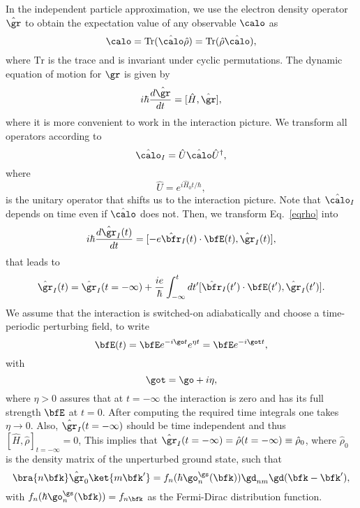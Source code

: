 \documentclass[floatfix,prb,aps,superscriptaddress,11pt,preprint,letterpaper]{revtex4}
\begin{document}
In the independent particle approximation, we use the electron density
operator $\hat\gr$ to obtain the expectation value of any observable
$\calo$ as
\begin{equation}\label{traza}
\calo=\mathrm{Tr}(\hat\calo\hat\rho)=\mathrm{Tr}(\hat\rho\hat\calo),
\end{equation}
where $\mathrm{Tr}$ is the trace and is invariant under cyclic permutations.
The dynamic equation of motion for $\gr$ is given by
\begin{equation}\label{eqrho}
i\hbar \frac{d\hat\gr}{dt}=[\hat{H},\hat\gr]
,
\end{equation}
where it is more convenient to work in the interaction picture. We transform 
all operators according to 
\begin{equation}\label{ip}
\hat{\calo}_I=\hat{U}\hat{\calo}\hat{U}^\dagger,
\end{equation}
where
\begin{equation}\label{ou}
\hat{U}=e^{i\hat{H}_0t/\hbar},
\end{equation}
is the unitary operator that shifts us to the interaction picture.
Note that $\hat\calo_I$ depends on time even if $\hat\calo$ does not.
Then, we transform Eq.~\eqref{eqrho} into
\begin{equation}\label{intrho}
i\hbar\frac{d\hat\gr_I(t)}{dt}=[-e\hat\bfr_I(t)\cdot\bfE(t),\hat\gr_I(t)],
\end{equation}
that leads to
\begin{equation}\label{intrho2}
\hat\gr_I(t)=\hat\gr_I(t=-\infty)
+
\frac{ie}{\hbar}\int_{-\infty}^t dt'[\hat\bfr_I(t')\cdot\bfE(t'),\hat\gr_I(t')].
\end{equation}
We assume that the interaction is switched-on adiabatically and
choose a time-periodic perturbing field, to write
\begin{equation}\label{efield}
\bfE(t)=\bfE e^{-i\go t}e^{\eta t}=\bfE e^{-i\got t}
,
\end{equation}
with
\begin{equation}\label{got}
\got=\go+i\eta
,
\end{equation} 
where $\eta > 0$ assures
that at $t=-\infty$ the interaction is zero and has its full strength $\bfE$ 
at $t=0$. After computing the required time integrals one takes
$\eta\to 0$. 
Also, $\hat\gr_I(t=-\infty)$ should be time independent and thus 
$[\hat{H},\hat\rho]_{t=-\infty}=0$, This implies that 
$\hat\gr_I(t=-\infty)=\hat\rho(t=-\infty)\equiv\hat\rho_0$,
where $\hat\rho_0$ is
the density matrix of the unperturbed ground state,
such that
\begin{equation}\label{nrhon}
\bra{n\bfk}\hat\gr_0\ket{m\bfk'}=f_n(\hbar\go^\gs_n(\bfk))\gd_{nm}\gd(\bfk-\bfk')
,
\end{equation}
with $f_n(\hbar\go^\gs_n(\bfk))=f_{n\bfk}$ as the Fermi-Dirac distribution function.
\end{document}
